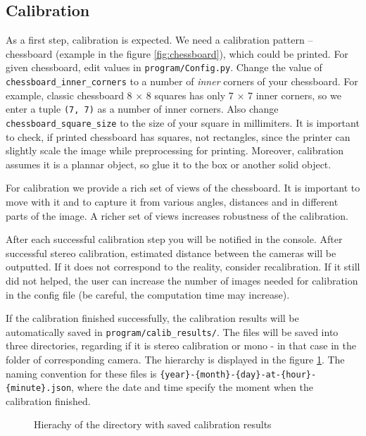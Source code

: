 \subsection{Calibration}
As a first step, calibration is expected. We need a calibration pattern --
chessboard (example in the figure \ref{fig:chessboard}), which could be
printed. For given chessboard, edit values in \verb+program/Config.py+. Change
the value of \verb+chessboard_inner_corners+ to a number of \emph{inner}
corners of your chessboard. For example, classic chessboard 8 $\times$ 8
squares has only 7 $\times$ 7 inner corners, so we enter a tuple \verb+(7, 7)+
as a number of inner corners. Also change \verb+chessboard_square_size+ to the
size of your square in millimiters. It is important to check, if printed
chessboard has squares, not rectangles, since the printer can slightly scale
the image while preprocessing for printing.  Moreover, calibration assumes it
is a plannar object, so glue it to the box or another solid object.

For calibration we provide a rich set of views of the chessboard. It is important
to move with it and to capture it from various angles, distances and in different
parts of the image. A richer set of views increases robustness of the calibration.

After each successful calibration step you will be notified in the console.
After successful stereo calibration, estimated distance between the cameras
will be outputted. If it does not correspond to the reality, consider
recalibration. If it still did not helped, the user can increase the number of
images needed for calibration in the config file (be careful, the computation
time may increase).

If the calibration finished successfully, the calibration results will be
automatically saved in \verb+program/calib_results/+. The files will be saved
into three directories, regarding if it is stereo calibration or mono - in that
case in the folder of corresponding camera. The hierarchy is displayed in the
figure \ref{fig:hierarchy-calib}. The naming convention for these files is
\verb+{year}-{month}-{day}-at-{hour}-{minute}.json+, where the date and time
specify the moment when the calibration finished.

\begin{figure}
 \caption{Hierachy of the directory with saved calibration results}
 \label{fig:hierarchy-calib}
\end{figure}

